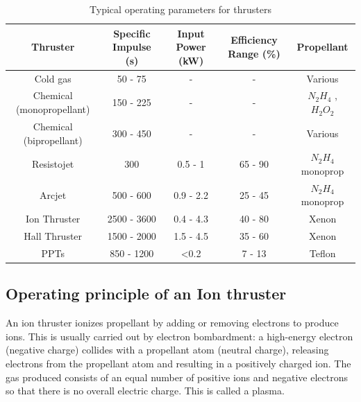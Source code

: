 \documentclass[11pt]{article}
\begin{document}
\begin{table}[h!]
\centering
\resizebox{\textwidth}{!} %
{
\begin{tabular}{|c|c|c|c|c|}
\hline
\textbf{Thruster}         & \textbf{Specific Impulse (s)} & \textbf{Input Power (kW)} & \textbf{Efficiency Range (\%)} & \textbf{Propellant} \\ \hline
Cold gas                  & 50 - 75                       & -                         & -                              & Various             \\ \hline
Chemical (monopropellant) & 150 - 225                     & -                         & -                              & $N_2H_4$ , $H_2O_2$ \\ \hline
Chemical (bipropellant)   & 300 - 450                     & -                         & -                              & Various             \\ \hline
Resistojet                & 300                           & 0.5 - 1                   & 65 - 90                        & $N_2H_4$ monoprop   \\ \hline
Arcjet                    & 500 - 600                     & 0.9 - 2.2                 & 25 - 45                        & $N_2H_4$ monoprop   \\ \hline
Ion Thruster              & 2500 - 3600                   & 0.4 - 4.3                 & 40 - 80                        & Xenon               \\ \hline
Hall Thruster             & 1500 - 2000                   & 1.5 - 4.5                 & 35 - 60                        & Xenon               \\ \hline
PPTs                      & 850 - 1200                    & \textless 0.2             & 7 - 13                         & Teflon              \\ \hline
\end{tabular}
}
\caption{Typical operating parameters for thrusters \cite{goebel}}
\label{}
\end{table}


\subsection{Operating principle of an Ion thruster}

An ion thruster ionizes propellant by adding or removing electrons to produce ions. This is usually carried out by electron bombardment: a high-energy electron (negative charge) collides with a propellant atom (neutral charge), releasing electrons from the propellant atom and resulting in a positively charged ion. The gas produced consists of an equal number of positive ions and negative electrons so that there is no overall electric charge. This is called a plasma.\\
\end{document}
